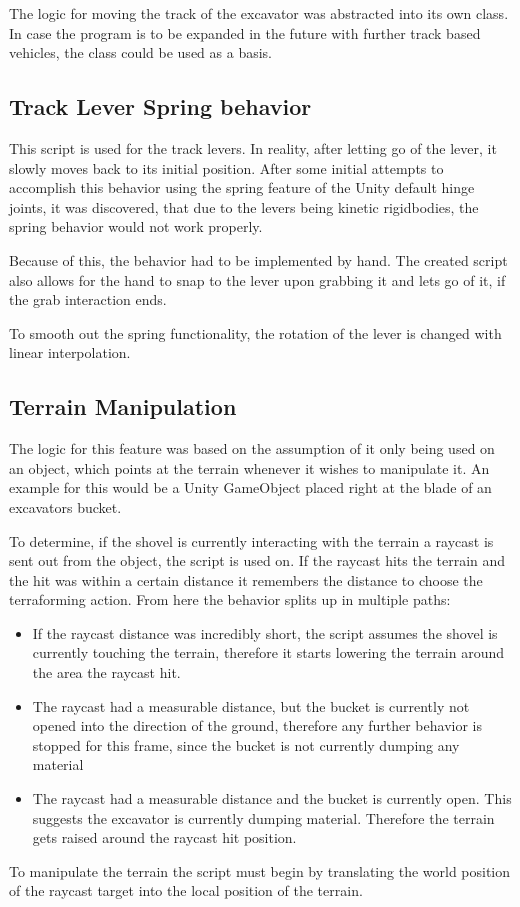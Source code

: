 \documentclass[journal]{vgtc}                     %
\begin{document}
The logic for moving the track of the excavator was abstracted into its own class. In case the program is to be expanded in the future with further track based vehicles, the class could be used as a basis.


\subsection{Track Lever Spring behavior} \label{trackLeverSpringBehavior}
This script is used for the track levers. In reality, after letting go of the lever, it slowly moves back to its initial position. After some initial attempts to accomplish this behavior using the spring feature of the Unity default hinge joints, it was discovered, that due to the levers being kinetic rigidbodies, the spring behavior would not work properly. 

Because of this, the behavior had to be implemented by hand. The created script also allows for the hand to snap to the lever upon grabbing it and lets go of it, if the grab interaction ends.

To smooth out the spring functionality, the rotation of the lever is changed with linear interpolation.


\subsection{Terrain Manipulation}

The logic for this feature was based on the assumption of it only being used on an object, which points at the terrain whenever it wishes to manipulate it. 
An example for this would be a Unity GameObject placed right at the blade of an excavators bucket.

To determine, if the shovel is currently interacting with the terrain a raycast is sent out from the object, the script is used on. If the raycast hits the terrain and the hit was within a certain distance it remembers the distance to choose the terraforming action. From here the behavior splits up in multiple paths:

\begin{itemize}
  \item If the raycast distance was incredibly short, the script assumes the shovel is currently touching the terrain, therefore it starts lowering the terrain around the area the raycast hit.
  \item The raycast had a measurable distance, but the bucket is currently not opened into the direction of the ground, therefore any further behavior is stopped for this frame, since the bucket is not currently dumping any material
  \item The raycast had a measurable distance and the bucket is currently open. This suggests the excavator is currently dumping material. Therefore the terrain gets raised around the raycast hit position.
\end{itemize}
To manipulate the terrain the script must begin by translating the world position of the raycast target into the local position of the terrain. 
\end{document}
